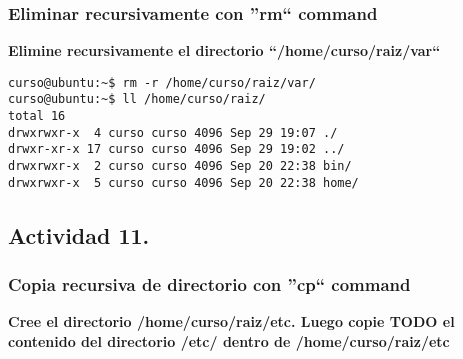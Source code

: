 \documentclass[a4paper,11pt,spanish]{article} %
\begin{document}
\subsubsection{Eliminar recursivamente con ''rm`` command}
\textbf{Elimine recursivamente el directorio ``/home/curso/raiz/var``}

\begin{verbatim}
curso@ubuntu:~$ rm -r /home/curso/raiz/var/
curso@ubuntu:~$ ll /home/curso/raiz/
total 16
drwxrwxr-x  4 curso curso 4096 Sep 29 19:07 ./
drwxr-xr-x 17 curso curso 4096 Sep 29 19:02 ../
drwxrwxr-x  2 curso curso 4096 Sep 20 22:38 bin/
drwxrwxr-x  5 curso curso 4096 Sep 20 22:38 home/
\end{verbatim}

\subsection{Actividad 11.}

\subsubsection{Copia recursiva de directorio con ''cp`` command}
\textbf{Cree el directorio /home/curso/raiz/etc. 
Luego copie TODO el contenido del directorio /etc/ dentro de /home/curso/raiz/etc}
\end{document}
